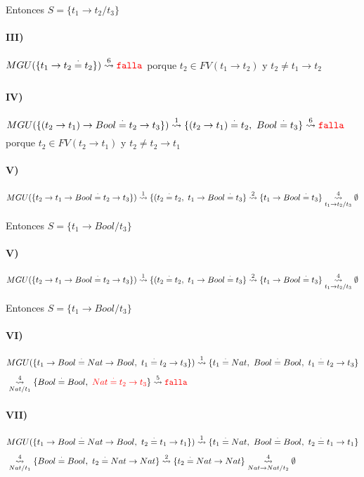 \documentclass[10pt,a4paper]{article}
\begin{document}
Entonces $S = \{t_1\to t_2/t_3\}$

\paragraph{III)}$MGU(\{t_1\to t_2\equalDot t_2\}) \goesTo{6}{} \falla$ porque $t_2\in FV(t_1\to t_2)$ y $t_2\neq t_1\to t_2$

\paragraph{IV)}$MGU(\{(t_2\to t_1)\to Bool\equalDot t_2\to t_3\}) \goesTo{1}{} \{(t_2\to t_1)\equalDot t_2,~ Bool\equalDot t_3\} \goesTo{6}{} \falla$ porque $t_2\in FV(t_2\to t_1)$ y $t_2\neq t_2\to t_1$

\paragraph{V)}$MGU(\{t_2\to t_1\to Bool\equalDot t_2\to t_3\}) \goesTo{1}{} \{(t_2\equalDot t_2,~ t_1\to Bool\equalDot t_3\} \goesTo{2}{} \{t_1\to Bool\equalDot t_3\} \goesTo{4}{t_1\to t_2/t_3} \emptyset$

Entonces $S = \{t_1\to Bool/t_3\}$

\paragraph{V)}$MGU(\{t_2\to t_1\to Bool\equalDot t_2\to t_3\}) \goesTo{1}{} \{(t_2\equalDot t_2,~ t_1\to Bool\equalDot t_3\} \goesTo{2}{} \{t_1\to Bool\equalDot t_3\} \goesTo{4}{t_1\to t_2/t_3} \emptyset$

Entonces $S = \{t_1\to Bool/t_3\}$

\paragraph{VI)}
\begin{align*}
&MGU(\{t_1\to Bool\equalDot Nat\to Bool, ~t_1\equalDot t_2\to t_3\}) \goesTo{1}{} \{t_1\equalDot Nat,~ Bool\equalDot Bool, ~t_1\equalDot t_2\to t_3\} \\
&\goesTo{4}{Nat/t_1} \{Bool\equalDot Bool, ~\red{Nat\equalDot t_2\to t_3}\} \goesTo{5}{} \falla
\end{align*}

\paragraph{VII)}
\begin{align*}
&MGU(\{t_1\to Bool\equalDot Nat\to Bool, ~t_2\equalDot t_1\to t_1\}) \goesTo{1}{} \{t_1\equalDot Nat,~ Bool\equalDot Bool, ~t_2\equalDot t_1\to t_1\} \\
&\goesTo{4}{Nat/t_1} \{Bool\equalDot Bool, ~t_2\equalDot Nat\to Nat\} \goesTo{2}{} \{t_2\equalDot Nat\to Nat\} \goesTo{4}{Nat\to Nat/t_2} \emptyset
\end{align*}
\end{document}
